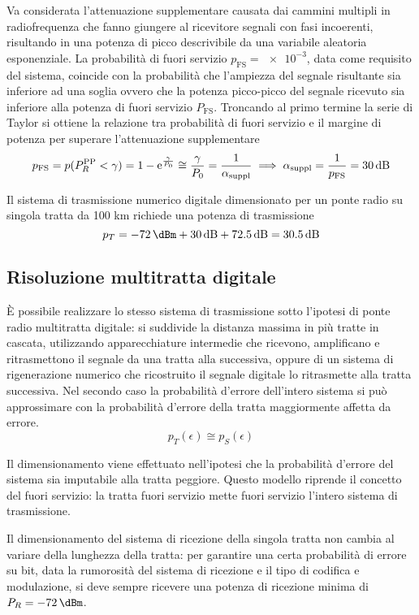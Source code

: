 Va considerata l'attenuazione supplementare causata dai cammini multipli in radiofrequenza che fanno giungere al ricevitore segnali con fasi incoerenti, risultando in una potenza di picco descrivibile da una variabile aleatoria esponenziale. La probabilità di fuori servizio $p_\text{FS}=\num{e-3}$, data come requisito del sistema, coincide con la probabilità che l'ampiezza del segnale risultante sia inferiore ad una soglia ovvero che la potenza picco-picco del segnale ricevuto sia inferiore alla potenza di fuori servizio $P_\text{FS}$. Troncando al primo termine la serie di Taylor si ottiene la relazione tra probabilità di fuori servizio e il margine di potenza per superare l'attenuazione supplementare
\[ p_\text{FS}=p(P_R^\text{PP}<\gamma)=1-\e{\frac{\gamma}{P_0}}\cong\frac{\gamma}{P_0}=\frac{1}{\alpha_\text{suppl}}\implies\alpha_\text{suppl}=\frac{1}{p_\text{FS}}=\SI{30}{\decibel}\]

Il sistema di trasmissione numerico digitale dimensionato per un ponte radio su singola tratta da 100 km richiede una potenza di trasmissione
\[p_T=\SI{-72}{\dBm}+\SI{30}{\decibel}+\SI{72.5}{\decibel}=\SI{30.5}{\decibel}\]

\subsection{Risoluzione multitratta digitale}
\`{E} possibile realizzare lo stesso sistema di trasmissione sotto l'ipotesi di ponte radio multitratta digitale: si suddivide la distanza massima in più tratte in cascata, utilizzando apparecchiature intermedie che ricevono, amplificano e ritrasmettono il segnale da una tratta alla successiva, oppure di un sistema di rigenerazione numerico che ricostruito il segnale digitale lo ritrasmette alla tratta successiva. Nel secondo caso la probabilità d'errore dell'intero sistema si può approssimare con la probabilità d'errore della tratta maggiormente affetta da errore.
\[p_T(\epsilon)\cong p_S(\epsilon)\]

Il dimensionamento viene effettuato nell'ipotesi che la probabilità d'errore del sistema sia imputabile alla tratta peggiore. Questo modello riprende il concetto del fuori servizio: la tratta fuori servizio mette fuori servizio l'intero sistema di trasmissione.

Il dimensionamento del sistema di ricezione della singola tratta non cambia al variare della lunghezza della tratta: per garantire una certa probabilità di errore su bit, data la rumorosità del sistema di ricezione e il tipo di codifica e modulazione, si deve sempre ricevere una potenza di ricezione minima di $P_R=\SI{-72}{\dBm}$.

